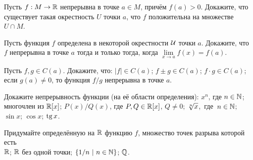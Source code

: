\documentclass[a4paper,12pt]{article}
\begin{document}
 Пусть $f:M \rightarrow \mathbb{R}$ непрерывна в точке $a\in M$, прич\"ем $f(a) > 0$.
Докажите, что существует такая окрестность $U$ точки $a$, что $f$
положительна на множестве $U \cap M$.



%

Пусть функция $f$ определена в некоторой окрестности $\cal U$ точки $a$. Докажите, что $f$ непрерывна в точке $a$ тогда и только тогда, когда
$\lim\limits_{x \to a} f(x)=f(a)$.




 Пусть $f, g\in C(a)$. Докажите, что:
 $|f|\in C(a)$;
 $f\pm g\in C(a)$;%
 $f\cdot g\in C(a)$; %
 если %
$g(a) \neq 0$,
то функция $f/g$ %
непрерывна в точке $a$.

 Докажите непрерывность функции (на е\"е области
определения):
 $x^n$, где $n\in\mathbb{N}$;
 \hskip-1pt многочлен из $\mathbb{R}[x]$; \hskip-1pt
 \hskip-1pt $P(x)/Q(x)$, где $P,Q\in\mathbb{R}[x]$, $Q\ne0$;\hskip-1pt
 \hskip-1pt $\root n \of x$,~где~$n\in\mathbb{N}$;\hskip-1pt
 \hskip-1pt $\sin x$;\hskip-1pt
 \hskip-1pt $\cos x$;\hskip-1pt
 \hskip-1pt $\tg x$.

 Придумайте определ\"енную на $\mathbb{R}$ функцию $f$, множество точек разрыва которой есть\\
 $\mathbb{R}$;
 $\mathbb{R}$ без одной точки;
 $\{1/n\ | \ n\in\mathbb{N}\}$;
 $\mathbb{Q}$.
\end{document}
